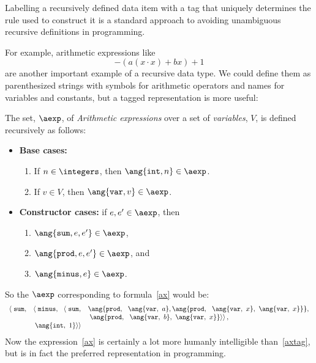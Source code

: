 \begin{definition}
Labelling a recursively defined data item with a tag that uniquely
determines the rule used to construct it is a standard approach to avoiding
unambiguous recursive definitions in programming.

For example, arithmetic expressions like
\begin{equation}\label{ax}
-(a(x\cdot x)+ bx) + 1
\end{equation}
are another important example of a recursive data type.  We could define
them as parenthesized strings with symbols for arithmetic operators and
names for variables and constants, but a tagged representation is more
useful:

\begin{definition}\label{A}
The set, $\aexp$, of \emph{Arithmetic expressions} over a set of
\emph{variables}, $V$, is defined recursively as follows:
\begin{itemize}
\item \textbf{Base cases:}
\begin{enumerate}
\item If $n \in \integers$, then $\ang{\texttt{int}, n} \in \aexp$.
\item If $v \in V$, then $\ang{\texttt{var}, v} \in \aexp$.
\end{enumerate}
\item \textbf{Constructor cases:} if $e,e' \in \aexp$, then
\begin{enumerate}
\item $\ang{\texttt{sum}, e, e'} \in \aexp$,
\item $\ang{\texttt{prod}, e, e'} \in \aexp$, and
\item $\ang{\texttt{minus}, e} \in \aexp$.
\end{enumerate}
\end{itemize}
\end{definition}

So the $\aexp$ corresponding to formula~\ref{ax} would be:
\begin{equation}\label{axtag}
\begin{array}{rll}
\left< \right. \texttt{sum}, 
         & \left< \right. \texttt{minus},\ \ \left< \right. \texttt{sum},
               & \ang{\texttt{prod},\ \ \ang{\texttt{var},\ a},
                                     \ang{\texttt{prod},\ \
                                            \ang{\texttt{var},\ x},\
                                            \ang{\texttt{var},\ x}}},\\
                               && \left. \left. \ang{\texttt{prod},\ \
                                       \ang{\texttt{var},\ b},\
                                       \ang{\texttt{var},\ x}}
                                   \right> \right>,\\
         & \left. \left. \ang{\texttt{int},\ 1} \right> \right>
\end{array}
\end{equation}
Now the expression~\ref{ax} is certainly a lot more humanly intelligible
than~\ref{axtag}, but is in fact the preferred representation in
programming.


\end{definition}
